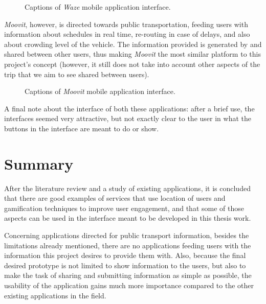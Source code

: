 \begin{figure}[h]
\begin{center}
\leavevmode
{} \hspace{1em}%
\caption{Captions of \emph{Waze} mobile application interface.}
\label{fig:waze}
\end{center}
\end{figure}

\emph{Moovit}, however, is directed towards public transportation, feeding users with information about schedules in real time, re-routing in case of  delays, and also about crowding level of the vehicle.
The information provided is generated by and shared between other users, thus making \emph{Moovit} the most similar platform to this project's concept (however, it still does not take into account other aspects of the trip that we aim to see shared between users).

\begin{figure}[h]
\begin{center}
\leavevmode
{} \hspace{1em}%
\caption{Captions of \emph{Moovit} mobile application interface.}
\label{fig:moovit}
\end{center}
\end{figure}

A final note about the interface of both these applications: after a brief use, the interfaces seemed very attractive, but not exactly clear to the user in what the buttons in the interface are meant to do or show.

\section{Summary}

After the literature review and a study of existing applications, it is concluded that there are good examples of services that use location of users and gamification techniques to improve user engagement, and that some of those aspects can be used in the interface meant to be developed in this thesis work. 

Concerning applications directed for public transport information, besides the limitations already mentioned, there are no applications feeding users with the information this project desires to provide them with. Also, because the final desired prototype is not limited to show information to the users, but also to make the task of sharing and submitting information as simple as possible, the usability of the application gains much more importance compared to the other existing applications in the field.
